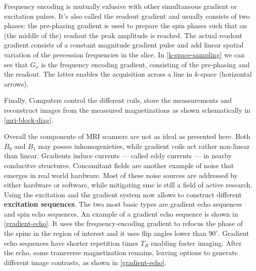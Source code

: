 Frequency encoding is mutually exlusive with other simultaneous gradient or excitation pulses.
It's also called the readout gradient and usually consists of two phases: the pre-phasing gradient is used to prepare the spin phases such that on (the middle of the) readout the peak amplitude is reached.
The actual readout gradient consists of a constant magnitude gradient pulse and add linear spatial variation of the precession frequencies in the slice.
In \ref{k-space-sampling} we can see that $G_x$ is the frequency encoding gradient, consisting of the pre-phasing and the readout.
The latter enables the acquisition across a line in $k$-space (horizontal arrows).



Finally, Computers control the different coils, store the meassurements and reconstruct images from the meassured magnetizations as shown schematically in \ref{mri-block-diag}. \\

Overall the components of MRI scanners are not as ideal as presented here.
Both $B_0$ and $B_1$ may posses inhomogenieties, while gradient coils act rather non-linear than linear.
Gradients induce currents --- called eddy currents --- in nearby conducitve structures.
Concomitant fields are another example of noise that emerges in real world hardware.
Most of these noise sources are addressed by either hardware or software, while mitigating sme is still a field of active research. \\

Using the excitation and the gradient system now allows to construct different \textbf{excitation sequences}.
The two most basic types are gradient echo sequences and spin echo sequences.
An example of a gradient echo sequence is shown in \ref{gradient-echo}.
It uses the frequency-encoding gradient to refocus the phase of the spins in the region of interest and it uses flip angles lower than $90^\circ$.
Gradient echo sequences have shorter repetition times $T_R$ enabling faster imaging.
After the echo, some transverse magnetization remains, leaving options to generate different image contrasts, as shown in \ref{gradient-echo}.

